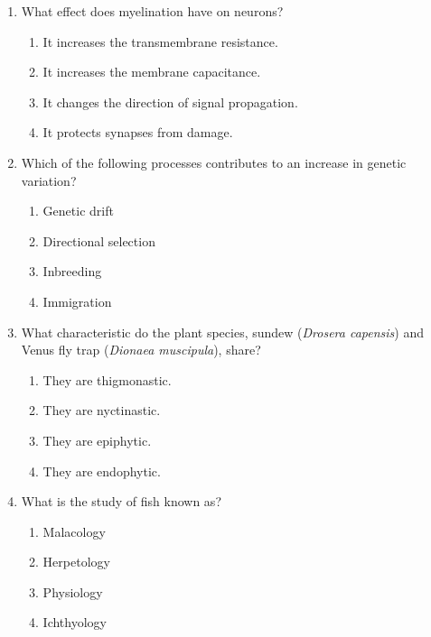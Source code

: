 \begin{enumerate}
\item What effect does myelination have on neurons?
\begin{multicols}{2}
\begin{enumerate}
\item It increases the transmembrane resistance.
\item It increases the membrane capacitance.
\item It changes the direction of signal propagation.
\item It protects synapses from damage.
\end{enumerate}
\end{multicols}

\item Which of the following processes contributes to an increase in genetic variation?
\begin{multicols}{2}
\begin{enumerate}
\item Genetic drift
\item Directional selection
\item Inbreeding
\item Immigration
\end{enumerate}
\end{multicols}

\item What characteristic do the plant species, sundew (\textit{Drosera capensis}) and Venus fly trap (\textit{Dionaea muscipula}), share?
\begin{multicols}{2}
\begin{enumerate}
\item They are thigmonastic.
\item They are nyctinastic.
\item They are epiphytic.
\item They are endophytic.
\end{enumerate}
\end{multicols}

\item What is the study of fish known as?
\begin{multicols}{2}
\begin{enumerate}
\item Malacology
\item Herpetology
\item Physiology
\item Ichthyology
\end{enumerate}
\end{multicols}


\end{enumerate}
